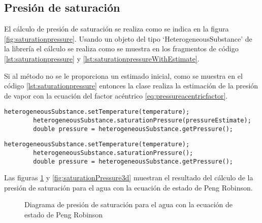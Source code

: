\subsection{Presión de saturación}\label{subsec:saturationpressure}

	El cálculo de presión de saturación se realiza como se indica en la figura \ref{fig:saturationpressure}. Usando un objeto del tipo `HeterogeneousSubstance' de la librería \Materia el cálculo se realiza como se muestra en los fragmentos de código \ref{lst:saturationpressure} y \ref{lst:saturationpressureWithEstimate}.

	Si al método no se le proporciona un estimado inicial, como se muestra en el código \ref{lst:saturationpressure} entonces la clase realiza la estimación de la presión de vapor con la ecuación del factor acéntrico \ref{eq:pressureacentricfactor}. 

	\begin{lstlisting}[label={lst:saturationpressureWithEstimate},caption={Cálculo de la presión de saturación proporcionando un estimado inicial.}]
		heterogeneousSubstance.setTemperature(temperature);
		heterogeneousSubstance.saturationPressure(pressureEstimate);
		double pressure = heterogeneousSubstance.getPressure();
	\end{lstlisting}


	\begin{lstlisting}[label={lst:saturationpressure},caption={Cálculo de la presión de saturación.}]
		heterogeneousSubstance.setTemperature(temperature);
		heterogeneousSubstance.saturationPressure();
		double pressure = heterogeneousSubstance.getPressure();
	\end{lstlisting}

	Las figuras \ref{fig:saturationPressure} y \ref{fig:saturationPressure3d} muestran el resultado del cálculo de la presión de saturación para el agua con la ecuación de estado de Peng Robinson.

\begin{figure}[!h]
	\centering	
	\caption{Diagrama de presión de saturación para el agua con la ecuación de estado de Peng Robinson}\label{fig:saturationPressure}
\end{figure}

